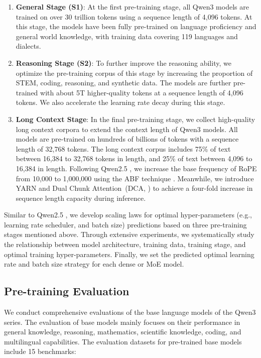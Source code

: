 \documentclass[dvipsnames]{article}
\begin{document}
\begin{enumerate}[label=(\arabic*)]
    \item \textbf{General Stage (S1)}: At the first pre-training stage, all Qwen3 models are trained on over 30 trillion tokens using a sequence length of 4,096 tokens. At this stage, the models have been fully pre-trained on language proficiency and general world knowledge, with training data covering 119 languages and dialects.  
    \item \textbf{Reasoning Stage (S2)}: To further improve the reasoning ability, we optimize the pre-training corpus of this stage by increasing the proportion of STEM, coding, reasoning, and synthetic data. The models are further pre-trained with about 5T higher-quality tokens at a sequence length of 4,096 tokens. We also accelerate the learning rate decay during this stage.
    \item \textbf{Long Context Stage}: In the final pre-training stage, we collect high-quality long context corpora to extend the context length of Qwen3 models. All models are pre-trained on hundreds of billions of tokens with a sequence length of 32,768 tokens. The long context corpus includes 75\% of text between 16,384 to 32,768 tokens in length, and 25\% of text between 4,096 to 16,384 in length. Following Qwen2.5 \citep{qwen2.5}, we increase the base frequency of RoPE from 10,000 to 1,000,000 using the ABF technique \citep{ropeabf}. Meanwhile, we introduce YARN \citep{yarn} and Dual Chunk Attention~(DCA, \citealp{chunkllama}) to achieve a four-fold increase in sequence length capacity during inference.
\end{enumerate}

Similar to Qwen2.5 \citep{qwen2.5}, we develop scaling laws for optimal hyper-parameters (e.g., learning rate scheduler, and batch size) predictions based on three pre-training stages mentioned above. Through extensive experiments, we systematically study the relationship between model architecture, training data, training stage, and optimal training hyper-parameters. Finally, we set the predicted optimal learning rate and batch size strategy for each dense or MoE model.

\subsection{Pre-training Evaluation}

We conduct comprehensive evaluations of the base language models of the Qwen3 series. 
The evaluation of base models mainly focuses on their performance in general knowledge, reasoning, mathematics, scientific knowledge, coding, and multilingual capabilities. The evaluation datasets for pre-trained base models include 15 benchmarks:
\end{document}
